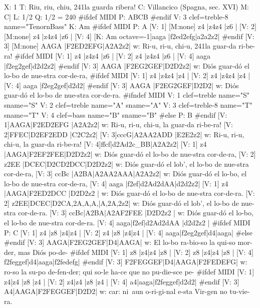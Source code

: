 \documentclass[a4paper,fullpage,12pt]{book}
\begin{document}
{\footnotesize
\begin{abcsource}
X: 1
T: Riu, riu, chiu, \bl{}241la guarda ribera!
C: Villancico (Spagna, sec. XVI)
M: C|
L: 1/2
Q: 1/2 = 240
#ifdef MIDI
P: ABCB
#endif
V: 3 clef=treble-8 name="Tenor\bl{}nBass"
K: Am
#ifdef MIDI
P: A
[V: 1] [M:none] z4               |z4z4    |z6    |
[V: 2] [M:none] z4               |z4z4    |z6    |
[V: 4] [K: Am octave=-1]\bl
[M:none] aaga             |f2ed2efg|a2a2z2|
#endif
[V: 3] [M:none] AAGA             |F2ED2EFG|A2A2z2|
w: Ri-u, ri-u, chi-u, \bl{}241la guar-da ri-be-ra!
%
#ifdef MIDI
[V: 1] z4               |z4z4    |z6    |
[V: 2] z4               |z4z4    |z6    |
[V: 4] aaga             |f2eg2gef|d2d2z2|
#endif
[V: 3] AAGA             |F2EG2GEF|D2D2z2|
w: Di\'os guar-d\'o el lo-bo de nue-stra cor-de-ra,
%
#ifdef MIDI
[V: 1] z4               |z4z4    |z4  |
[V: 2] z4               |z4z4    |z4  |
[V: 4] aaga             |f2eg2gef|d2d2|
#endif
[V: 3] AAGA             |F2EG2GEF|D2D2|
w: Di\'os guar-d\'o el lo-bo de nue-stra cor-de-ra.
#ifndef MIDI
V: 1 clef=treble   name="S" sname="S"
V: 2 clef=treble   name="A" sname="A"
V: 3 clef=treble-8 name="T" sname="T"
V: 4 clef=bass     name="B" sname="B"
#else
P: B
#endif
[V: 1]AAGA|F2ED2EFG |A2A2z2|
w: Ri-u, ri-u, chi-u, la guar-da ri-be-ra!
[V: 2]FFEC|D2EF2EDD |C2C2z2|
[V: 3]cccG|A2AA2ADD |E2E2z2|
w: Ri-u, ri-u, chi-u, la guar-da ri-be-ra!
[V: 4]ffcf|d2Ad2c_BB|A2A2z2|
%
[V: 1] z4      |AAGA|F2EF2FEE|D2D2z2|
w: Di\'os guar-d\'o el lo-bo de nue-stra cor-de-ra,
[V: 2] z2EE    |DCEC|D2CD2DCC|D2D2z2|
w: Di\'os guar-d\'o el lob', el lo-bo de nue-stra cor-de-ra,
[V: 3] ccBc    |A2BA|A2AA2AAA|A2A2z2|
w: Di\'os guar-d\'o el lo-bo, el lo-bo de nue-stra cor-de-ra,
[V: 4] aaga    |f2ef|d2Ad2dAA|d2d2z2|
%
[V: 1] z4  |AAGA|F2ED2DCC    |D2D2z2  |
w: Di\'os guar-d\'o el lo-bo de nue-stra cor-de-ra.
[V: 2] z2EE|DCEC|D2CA,2A,A,A,|A,2A,2z2|
w: Di\'os guar-d\'o el lob', el lo-bo de nue-stra cor-de-ra.
[V: 3] ccBc|A2BA|A2AF2FEE    |D2D2z2  |
w: Di\'os guar-d\'o el lo-bo, el lo-bo de nue-stra cor-de-ra.
[V: 4] aaga|f2ef|d2Ad2dAA    |d2d2z2  |
#ifdef MIDI
P: C
[V: 1] z4  |z8      |z4|z4  |
[V: 2] z4  |z8      |z4|z4  |
[V: 4] aaga|f2eg2gef|d4|aaga|
#else
#endif
[V: 3] AAGA|F2EG2GEF|D4|AAGA|
w: El lo-bo ra-bio-so la qui-so mor-der, mas Di\'os po-de-
%
#ifdef MIDI
[V: 1] z8      |z4|z4  |z8      |
[V: 2] z8      |z4|z4  |z8      |
[V: 4] f2feggef|d4|aaga|f2fedefg|
#endif
[V: 3] F2FEGGEF|D4|AAGA|F2FEDEFG|
w: ro-so la su-po de-fen-der; qui so-le ha-ce que no pu-die-sce pe-
%
#ifdef MIDI
[V: 1] z4|z4  |z8      |z4  |
[V: 2] z4|z4  |z8      |z4  |
[V: 4] a4|aaga|f2feggef|d2d2|
#endif
[V: 3] A4|AAGA|F2FEGGEF|D2D2|
w: car: ni~aun o-ri-gi-nal e-sta Vir-gen no tu-vie-ra.
\end{abcsource}
}
\end{document}
